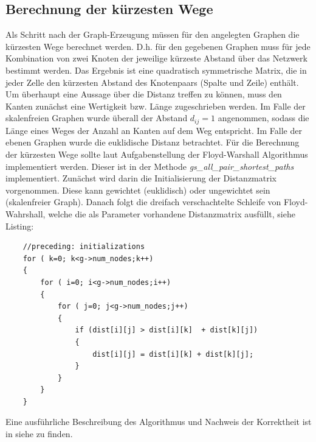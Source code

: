 \documentclass[10pt]{article}
\begin{document}
\subsection{Berechnung der kürzesten Wege}
Als Schritt nach der Graph-Erzeugung müssen für den angelegten Graphen die kürzesten Wege berechnet werden. D.h. für den gegebenen Graphen muss für jede Kombination von zwei Knoten der jeweilige kürzeste Abstand über das Netzwerk bestimmt werden. Das Ergebnis ist eine quadratisch symmetrische Matrix, die in jeder Zelle den kürzesten Abstand des Knotenpaars (Spalte und Zeile) enthält. 
Um überhaupt eine Aussage über die Distanz treffen zu können, muss den Kanten zunächst eine Wertigkeit bzw. Länge zugeschrieben werden. Im Falle der skalenfreien Graphen wurde überall der Abstand $d_{ij}=1$ angenommen, sodass die Länge eines Weges der Anzahl an Kanten auf dem Weg entspricht. Im Falle der ebenen Graphen wurde die euklidische Distanz betrachtet. Für die Berechnung der kürzesten Wege sollte laut Aufgabenstellung der Floyd-Warshall Algorithmus implementiert werden. Dieser ist in der Methode \textit{gs\_all\_pair\_shortest\_paths} implementiert. Zunächst wird darin die Initialisierung der Distanzmatrix vorgenommen. Diese kann gewichtet (euklidisch) oder ungewichtet sein (skalenfreier Graph). Danach folgt die dreifach verschachtelte Schleife von Floyd-Wahrshall, welche die als Parameter vorhandene Distanzmatrix ausfüllt, siehe Listing:
\begin{lstlisting}
    //preceding: initializations
    for ( k=0; k<g->num_nodes;k++)
    {
        for ( i=0; i<g->num_nodes;i++)
        {
            for ( j=0; j<g->num_nodes;j++)
            {
                if (dist[i][j] > dist[i][k]  + dist[k][j])
                {
                    dist[i][j] = dist[i][k] + dist[k][j];
                }
            }
        }
    }
\end{lstlisting}
Eine ausführliche Beschreibung des Algorithmus und Nachweis der Korrektheit ist in siehe \cite{Floyd} zu finden.
\end{document}
